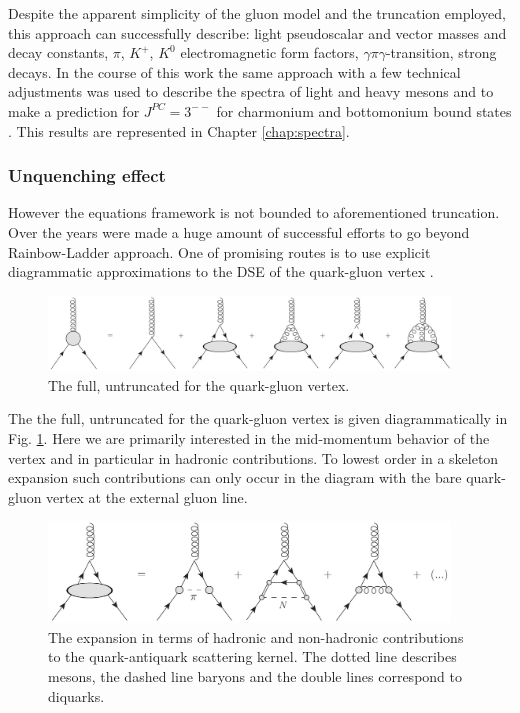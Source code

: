 Despite the apparent simplicity of the gluon model and the truncation employed, this approach can successfully describe: light pseudoscalar and vector masses and decay constants\cite{Maris:1997tm, Maris:1999nt}, $\pi$, $K^+$, $K^0$ electromagnetic form factors\cite{Maris:2000sk}, $\gamma \pi \gamma$-transition\cite{Maris:2002mz}, strong decays\cite{Jarecke:2002xd}. In the course of this work the same approach with a few technical adjustments was used to describe the spectra of light and heavy mesons and to make a prediction for $J^{PC}=3^{--}$ for charmonium and bottomonium bound states \cite{Fischer:2014cfa, Fischer:2014xha}. This results are represented in Chapter \ref{chap:spectra}.
%
%
%
\subsubsection*{Unquenching effect}
However the \DS equations framework is not bounded to aforementioned truncation. Over the years were made a huge amount of successful efforts to go beyond Rainbow-Ladder approach. One of promising routes is to use explicit diagrammatic approximations to the DSE of the quark-gluon vertex \cite{Bender:1996bb,Watson:2004kd,Bhagwat:2004hn,Matevosyan:2006bk,Alkofer:2008tt,Fischer:2007ze,Fischer:2009jm}. 
\begin{figure}[H]
\tiny
 \begin{center}
  \includegraphics[width=0.95\textwidth]{figures/qqg_vertex_gen}
 \end{center}
 \caption{\footnotesize The full, untruncated \DSE for the quark-gluon vertex. }\label{fig:qqg_vertex_gen} 
\end{figure}
The the full, untruncated \DSE for the quark-gluon vertex is given diagrammatically in
Fig. \ref{fig:qqg_vertex_gen}. Here we are primarily interested in the mid-momentum behavior of the vertex and in particular in hadronic
contributions. To lowest order in a skeleton expansion such contributions can only occur in the diagram with the bare quark-gluon vertex at the external gluon line. 
\begin{figure}[H]
\tiny
 \begin{center}
  \includegraphics[width=0.95\textwidth]{figures/qqg_hadron}
 \end{center}
 \caption{\footnotesize The expansion in terms of hadronic and non-hadronic
contributions to the quark-antiquark scattering kernel. The dotted line describes mesons, the dashed line baryons and the double lines correspond to diquarks.  }\label{fig:qqg_hadron} 
\end{figure}
